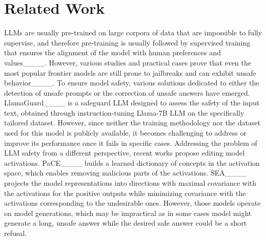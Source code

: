\section{Related Work}
LLMs are usually pre-trained on large corpora of data that are impossible to fully supervise, and therefore pre-training is usually followed by supervised training that ensures the alignment of the model with human preferences and values____. %
However, various studies and practical cases prove that even the most popular frontier models are still prone to jailbreaks and can exhibit unsafe behavior____. To ensure model safety, various solutions dedicated to either the detection of unsafe prompts or the correction of unsafe answers have emerged.
LlamaGuard____ is a safeguard LLM designed to assess the safety of the input text, obtained through instruction-tuning Llama-7B LLM on the specifically tailored dataset. 
However, since neither the training methodology nor the dataset used for this model is publicly available, it becomes challenging to address or improve its performance once it fails in specific cases.
Addressing the problem of LLM safety from a different perspective, 
recent works propose editing model activations. PaCE____ builds a learned dictionary of concepts in the activation space, which enables removing malicious parts of the activations. SEA____ projects the model representations into directions with maximal covariance with the activations for the positive outputs while minimizing covariance with the activations corresponding to the undesirable ones. However, those models operate on model generations, which may be impractical as in some cases model might generate a long, unsafe answer while the desired safe answer could be a short refusal.